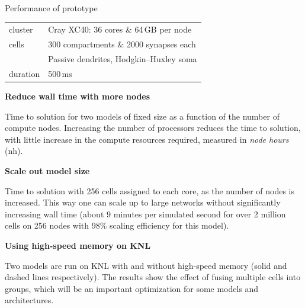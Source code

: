 \documentclass[a0paper,portrait]{baposter}
\newcommand{\imageheader}[1]{\begin{center}\bfseries\large{#1}\end{center} \vspace{-2pt}}
\newcommand{\newemph}[1]{{\color{blue!40!black}\em #1}}
\begin{document}
\begin{poster}
\begin{posterbox}[name=plots,column=2,below=help,span=1]{Performance of prototype}
        \colorbox[HTML]{FCF3CF}{%
            \begin{tabularx}{0.95\textwidth}{l|X}
                \footnotesize cluster
                    &\footnotesize Cray XC40: 36 cores \& 64\,GB per node\smallskip\\
                \footnotesize cells
                    &\footnotesize 300 compartments \& 2000 synapses each\\
                    &\footnotesize Passive dendrites, Hodgkin–Huxley soma\smallskip\\
                \footnotesize duration
                    &\footnotesize 500\,ms\smallskip\\
            \end{tabularx}
        }
    \vskip4pt
    \imageheader{Reduce wall time with more nodes}
    
    { \small
    Time to solution for two models of fixed size as a function of the number of compute nodes.
    Increasing the number of processors reduces the time to solution, with little increase in the compute resources required, measured in \newemph{node hours} (nh).
    }

    \imageheader{Scale out model size}
    
    { \small
    Time to solution with 256 cells assigned to each core, as the number of nodes is increased.
    This way one can scale up to large networks without significantly increasing wall time (about 9 minutes per simulated second for over 2 million cells on 256 nodes with 98\% scaling efficiency for this model).
    }

    \imageheader{Using high-speed memory on KNL}
    
    { \small
    Two models are run on KNL with and without high-speed memory (solid and dashed lines respectively).
    The results show the effect of fusing multiple cells into groups, which will be an important optimization for some models and architectures.
    }

    \vspace{10pt}
\end{posterbox}

\end{poster}
\end{document}
